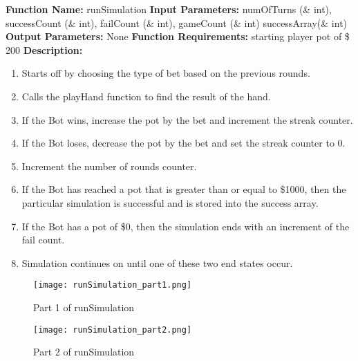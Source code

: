 {{{\newpage
\textbf{Function Name:} runSimulation
\newline
\textbf{Input Parameters:} numOfTurns (\& int), successCount (\& int), failCount (\& int), gameCount (\& int) successArray(\& int)
\newline
\textbf{Output Parameters:} None 
\newline
\textbf{Function Requirements:} starting player pot of \$ 200
\newline
\textbf{Description: }
\begin{enumerate}
	\item Starts off by choosing the type of bet based on the previous rounds. 
	\item Calls the playHand function to find the result of the hand.
	\item If the Bot wins, increase the pot by the bet and increment the streak counter.
	\item If the Bot loses, decrease the pot by the bet and set the streak counter to 0.
	\item Increment the number of rounds counter.
	\item If the Bot has reached a pot that is greater than or equal to \$1000, then the particular simulation is successful and is stored into the success array.
	\item If the Bot has a pot of \$0, then the simulation ends with an increment of the fail count.
	\item Simulation continues on until one of these two end states occur.
\end{enumerate}

\begin{figure}[H]
	\centering
	\texttt{[image: runSimulation\_part1.png]}\\
	\caption{Part 1 of runSimulation}
	\label{fig:tobias}
\end{figure}

\begin{figure}[H]
	\centering
	\texttt{[image: runSimulation\_part2.png]}\\
	\caption{Part 2 of runSimulation}
	\label{fig:tobias}
\end{figure}


}}}
